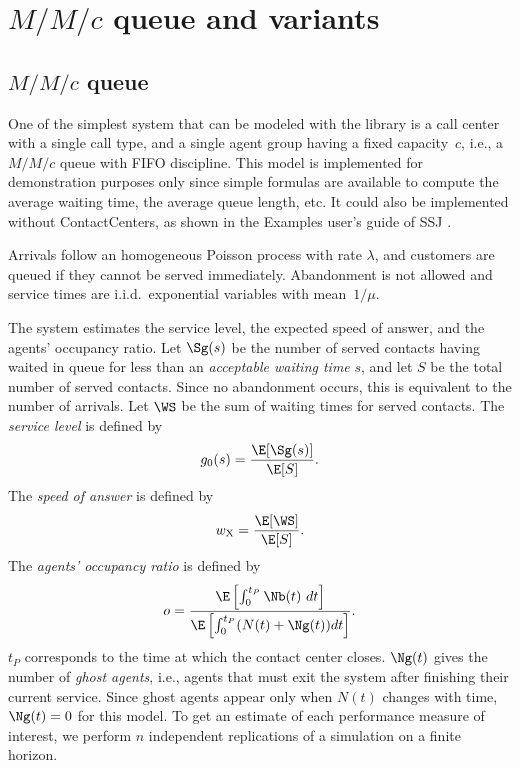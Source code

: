 \section{$M/M/c$ queue and variants}
\label{sec:MMC}

\subsection{$M/M/c$ queue}

One of the simplest system that can be modeled with the
library is a
call center with a single call type, and a single agent group having a fixed
capacity~$c$, i.e., a $M/M/c$ queue with FIFO discipline.
This model is implemented for demonstration purposes only since
simple formulas are available to compute the average
waiting time, the average queue length, etc. \cite{pKLE75a}
It could also be implemented without ContactCenters, as shown in the
Examples user's guide of SSJ \cite{iLEC04j}.

Arrivals
follow an homogeneous Poisson process with rate
$\lambda$, and customers
are queued if they cannot be served immediately.  Abandonment is not
allowed and service times are i.i.d.\ exponential variables with mean~$1/\mu$.

The
system estimates
the service level, the expected speed of answer,
and the agents' occupancy ratio.
Let $\Sg(s)$ be the number of
served contacts
having waited in queue for less than an \emph{acceptable waiting time}
$s$, and let $S$
be the total number of served contacts.
Since no abandonment occurs, this is equivalent to
the number of arrivals.
 Let $\WS$ be the sum of waiting times for
served contacts.
The \emph{service level} is defined by
\begin{equation}
g_0(s)=\frac{\E[\Sg(s)]}{\E[S]}.\label{eq:slnoab}
\end{equation}
The \emph{speed of answer} is defined by
\begin{equation}
w_{\mathrm{X}}=\frac{\E[\WS]}{\E[S]}.\label{eq:sans}
\end{equation}
The \emph{agents' occupancy ratio} is defined by
\begin{equation}
o=\frac{\E\left[\int_0^{t_P} \Nb(t)\ dt\right]}{\E\left[\int_0^{t_P}
    (N(t)+\Ng(t)) dt\right]}.\label{eq:occ}
\end{equation}
$t_P$ corresponds to the time at which the contact center closes.
$\Ng(t)$ gives the number of \emph{ghost agents}, i.e.,
agents that must exit the system after finishing their current
service.  Since ghost agents appear only when $N(t)$ changes with time,
$\Ng(t)=0$ for this model.
To get an estimate of each performance measure of interest, we perform
$n$ independent replications of a simulation on a
finite horizon.

